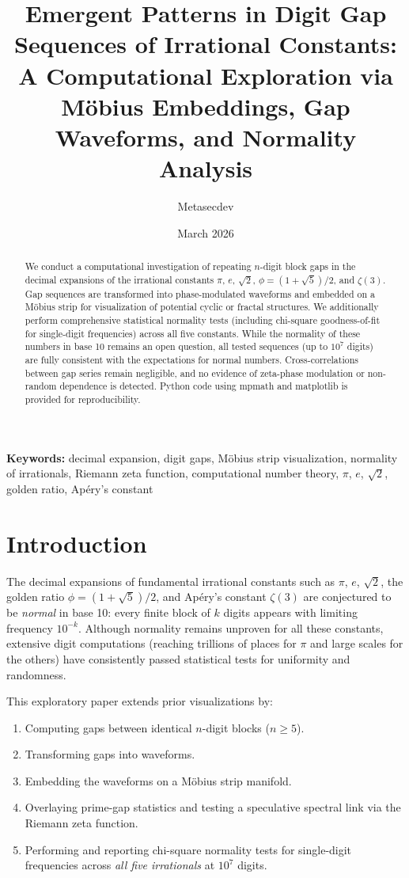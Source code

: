 \documentclass[11pt]{amsart}
\title{Emergent Patterns in Digit Gap Sequences of Irrational Constants: \\
A Computational Exploration via Möbius Embeddings, Gap Waveforms, and Normality Analysis}
\author{Metasecdev}
\date{March 2026}
\theoremstyle{plain}
\theoremstyle{definition}
\begin{document}
\maketitle

\begin{abstract}
We conduct a computational investigation of repeating $n$-digit block gaps in the decimal expansions of the irrational constants $\pi$, $e$, $\sqrt{2}$, $\phi = (1+\sqrt{5})/2$, and $\zeta(3)$. Gap sequences are transformed into phase-modulated waveforms and embedded on a Möbius strip for visualization of potential cyclic or fractal structures. We additionally perform comprehensive statistical normality tests (including chi-square goodness-of-fit for single-digit frequencies) across all five constants. While the normality of these numbers in base 10 remains an open question, all tested sequences (up to $10^7$ digits) are fully consistent with the expectations for normal numbers. Cross-correlations between gap series remain negligible, and no evidence of zeta-phase modulation or non-random dependence is detected. Python code using mpmath and matplotlib is provided for reproducibility.
\end{abstract}

\textbf{Keywords:} decimal expansion, digit gaps, Möbius strip visualization, normality of irrationals, Riemann zeta function, computational number theory, $\pi$, $e$, $\sqrt{2}$, golden ratio, Apéry's constant

\section{Introduction}
The decimal expansions of fundamental irrational constants such as $\pi$, $e$, $\sqrt{2}$, the golden ratio $\phi = (1+\sqrt{5})/2$, and Apéry's constant $\zeta(3)$ are conjectured to be \emph{normal} in base 10: every finite block of $k$ digits appears with limiting frequency $10^{-k}$. Although normality remains unproven for all these constants, extensive digit computations (reaching trillions of places for $\pi$ and large scales for the others) have consistently passed statistical tests for uniformity and randomness.

This exploratory paper extends prior visualizations by:
\begin{enumerate}
    \item Computing gaps between identical $n$-digit blocks ($n \geq 5$).
    \item Transforming gaps into waveforms.
    \item Embedding the waveforms on a Möbius strip manifold.
    \item Overlaying prime-gap statistics and testing a speculative spectral link via the Riemann zeta function.
    \item Performing and reporting chi-square normality tests for single-digit frequencies across \emph{all five irrationals} at $10^7$ digits.
\end{enumerate}
\end{document}
